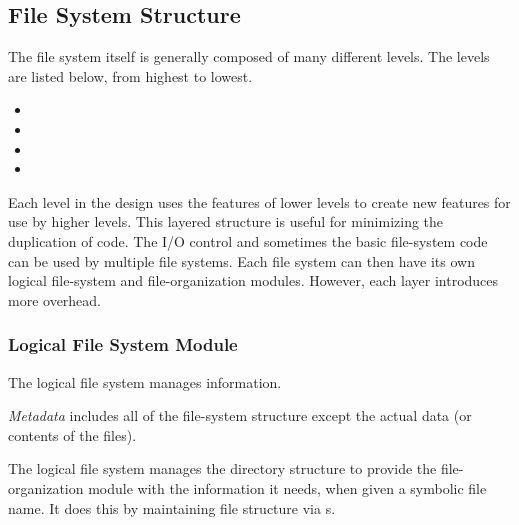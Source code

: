 \subsection{File System Structure}\label{subsec:File_System_Structure}
The file system itself is generally composed of many different levels.
The levels are listed below, from highest to lowest.
\begin{itemize}[noitemsep]
\item {}
\item {}
\item {}
\item {}
\end{itemize}

Each level in the design uses the features of lower levels to create new features for use by higher levels.
This layered structure is useful for minimizing the duplication of code.
The I/O control and sometimes the basic file-system code can be used by multiple file systems.
Each file system can then have its own logical file-system and file-organization modules.
However, each layer introduces more overhead.

\subsubsection{Logical File System Module}\label{subsubsec:Logical_FS_Module}
The logical file system manages  information.

\begin{definition}[Metadata]\label{def:File_Metadata}
  \emph{Metadata} includes all of the file-system structure except the actual data (or contents of the files).
\end{definition}

The logical file system manages the directory structure to provide the file-organization module with the information it needs, when given a symbolic file name.
It does this by maintaining file structure via s.


